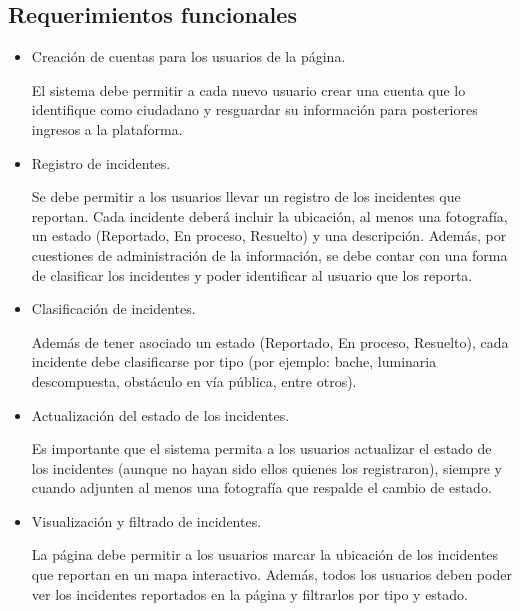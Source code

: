 \subsection{Requerimientos funcionales}
\begin{itemize}
    \item Creación de cuentas para los usuarios de la página.
    
    El sistema debe permitir a cada nuevo usuario crear una cuenta que lo identifique como ciudadano y resguardar su información para posteriores ingresos a la plataforma. 
    
    \item Registro de incidentes.
    
    Se debe permitir a los usuarios llevar un registro de los incidentes que reportan. Cada incidente deberá incluir la ubicación, al menos una fotografía, un estado (Reportado, En proceso, Resuelto) y una descripción. Además, por cuestiones de administración de la información, se debe contar con una forma de clasificar los incidentes y poder identificar al usuario que los reporta.
    
    \item Clasificación de incidentes.
    
    Además de tener asociado un estado (Reportado, En proceso, Resuelto), cada incidente debe clasificarse por tipo (por ejemplo: bache, luminaria descompuesta, obstáculo en vía pública, entre otros).
    
    \item Actualización del estado de los incidentes.
    
    Es importante que el sistema permita a los usuarios actualizar el estado de los incidentes (aunque no hayan sido ellos quienes los registraron), siempre y cuando adjunten al menos una fotografía que respalde el cambio de estado.
    
    \item Visualización y filtrado de incidentes.
    
    La página debe permitir a los usuarios marcar la ubicación de los incidentes que reportan en un mapa interactivo. Además, todos los usuarios deben poder ver los incidentes reportados en la página y filtrarlos por tipo y estado.

\end{itemize}

